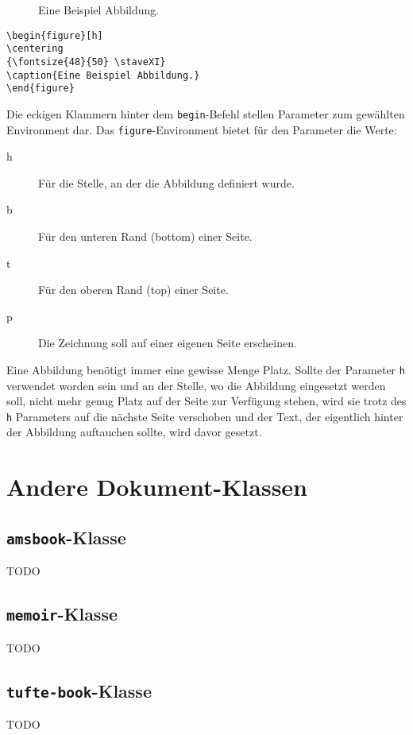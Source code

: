 \begin{figure}[h]
\centering
{\fontsize{48}{50} \staveXI}
\caption{Eine Beispiel Abbildung.}
\end{figure}

\begin{verbatim}
\begin{figure}[h]
\centering
{\fontsize{48}{50} \staveXI}
\caption{Eine Beispiel Abbildung.}
\end{figure}
\end{verbatim}
Die eckigen Klammern hinter dem \texttt{begin}-Befehl stellen Parameter zum gewählten Environment dar. Das \texttt{figure}-Environment bietet für den Parameter die Werte:
\begin{description}
\item[h] Für die Stelle, an der die Abbildung definiert wurde.
\item[b] Für den unteren Rand (bottom) einer Seite. 
\item[t] Für den oberen Rand (top) einer Seite.
\item[p] Die Zeichnung soll auf einer eigenen Seite erscheinen.
\end{description}
Eine Abbildung benötigt immer eine gewisse Menge Platz. Sollte der Parameter \texttt{h} verwendet worden sein und an der Stelle, wo die Abbildung eingesetzt werden soll, nicht mehr genug Platz auf der Seite zur Verfügung stehen, wird sie trotz des \texttt{h} Parameters auf die nächste Seite verschoben und der Text, der eigentlich hinter der Abbildung auftauchen sollte, wird davor gesetzt.

\section{Andere Dokument-Klassen}

\subsection{\texttt{amsbook}-Klasse}
TODO

\subsection{\texttt{memoir}-Klasse}
TODO

\subsection{\texttt{tufte-book}-Klasse}
TODO

